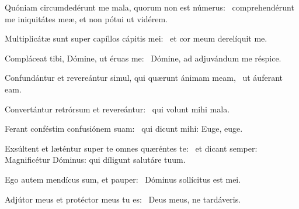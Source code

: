 \item Quóniam circumdedérunt me mala, quorum non est númerus:~\psstar{} comprehendérunt me iniquitátes meæ, et non pótui ut vidérem.

\item Multiplicátæ sunt super capíllos cápitis mei:~\psstar{} et cor meum derelíquit me.

\item Compláceat tibi, Dómine, ut éruas me:~\psstar{} Dómine, ad adjuvándum me réspice.

\item Confundántur et revereántur simul, qui quærunt ánimam meam,~\psstar{} ut áuferant eam.

\item Convertántur retrórsum et revereántur:~\psstar{} qui volunt mihi mala.

\item Ferant conféstim confusiónem suam:~\psstar{} qui dicunt mihi: Euge, euge.

\item Exsúltent et læténtur super te omnes quæréntes te:~\psstar{} et dicant semper: Magnificétur Dóminus: qui díligunt salutáre tuum.

\item Ego autem mendícus sum, et pauper:~\psstar{} Dóminus sollícitus est mei.

\item Adjútor meus et protéctor meus tu es:~\psstar{} Deus meus, ne tardáveris.

